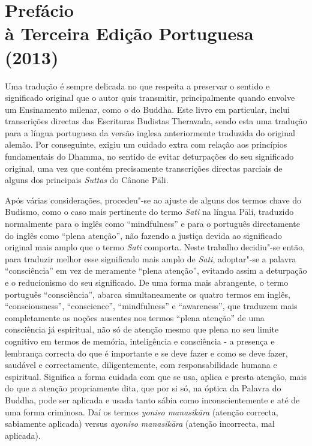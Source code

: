 \chapter[Prefácio à Terceira Edição Portuguesa (2013)]{Prefácio\\ à Terceira Edição Portuguesa\\ (2013)}

Uma tradução é sempre delicada no que respeita a preservar o sentido e
significado original que o autor quis transmitir, principalmente quando envolve
um Ensinamento milenar, como o do Buddha. Este livro em particular, inclui
transcrições directas das Escrituras Budistas Theravada, sendo esta uma tradução
para a língua portuguesa da versão inglesa anteriormente traduzida do original
alemão. Por conseguinte, exigiu um cuidado extra com relação aos princípios
fundamentais do Dhamma, no sentido de evitar deturpações do seu significado
original, uma vez que contém precisamente transcrições directas parciais de
alguns dos principais \emph{Suttas} do Cânone Pāli.

Após várias considerações, procedeu"-se ao ajuste de alguns dos termos chave do
Budismo, como o caso mais pertinente do termo \emph{Sati} na língua Pāli,
traduzido normalmente para o inglês como “mindfulness” e para o português
directamente do inglês como “plena atenção”, não fazendo a justiça devida ao
significado original mais amplo que o termo \emph{Sati} comporta. Neste trabalho
decidiu"-se então, para traduzir melhor esse significado mais amplo de
\emph{Sati}, adoptar"-se a palavra “consciência” em vez de meramente “plena
atenção”, evitando assim a deturpação e o reducionismo do seu significado. De
uma forma mais abrangente, o termo português “consciência”, abarca
simultaneamente os quatro termos em inglês, “consciousness”, “conscience”,
“mindfulness” e “awareness”, que traduzem mais completamente as noções
ausentes nos termos “plena atenção” de uma consciência já espiritual, não só
de atenção mesmo que plena no seu limite cognitivo em termos de memória,
inteligência e consciência - a presença e lembrança correcta do que é importante
e se deve fazer e como se deve fazer, saudável e correctamente, diligentemente,
com responsabilidade humana e espiritual. Significa a forma cuidada com que se
usa, aplica e presta atenção, mais do que a atenção propriamente dita, que por
si só, na óptica da Palavra do Buddha, pode ser aplicada e usada tanto sábia
como inconscientemente e até de uma forma criminosa. Daí os termos \emph{yoniso
  manasikāra} (atenção correcta, sabiamente aplicada) versus \emph{ayoniso
  manasikāra} (atenção incorrecta, mal aplicada).

